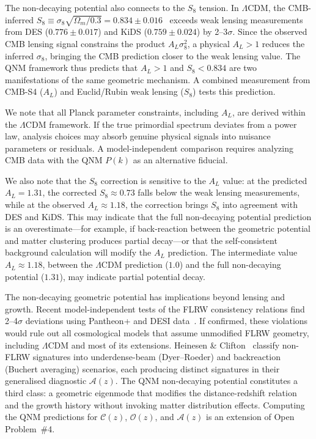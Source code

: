 \documentclass[aps,prd,twocolumn,superscriptaddress,showpacs,preprintnumbers,amsmath,amssymb,nofootinbib]{revtex4-2}
\newcommand{\lcdm}{$\Lambda$CDM}
\begin{document}
The non-decaying potential also connects to the $S_8$ tension. In \lcdm, the CMB-inferred $S_8 \equiv \sigma_8\sqrt{\Omega_m/0.3} = 0.834 \pm 0.016$~\cite{Planck2020} exceeds weak lensing measurements from DES ($0.776 \pm 0.017$) and KiDS ($0.759 \pm 0.024$) by 2--3$\sigma$. Since the observed CMB lensing signal constrains the product $A_L \sigma_8^2$, a physical $A_L > 1$ reduces the inferred $\sigma_8$, bringing the CMB prediction closer to the weak lensing value. The QNM framework thus predicts that $A_L > 1$ and $S_8 < 0.834$ are two manifestations of the same geometric mechanism. A combined measurement from CMB-S4 ($A_L$) and Euclid/Rubin weak lensing ($S_8$) tests this prediction.

We note that all Planck parameter constraints, including $A_L$, are derived within the \lcdm{} framework. If the true primordial spectrum deviates from a power law, analysis choices may absorb genuine physical signals into nuisance parameters or residuals. A model-independent comparison requires analyzing CMB data with the QNM $P(k)$ as an alternative fiducial.

We also note that the $S_8$ correction is sensitive to the $A_L$ value: at the predicted $A_L = 1.31$, the corrected $S_8 \approx 0.73$ falls below the weak lensing measurements, while at the observed $A_L \approx 1.18$, the correction brings $S_8$ into agreement with DES and KiDS. This may indicate that the full non-decaying potential prediction is an overestimate---for example, if back-reaction between the geometric potential and matter clustering produces partial decay---or that the self-consistent background calculation will modify the $A_L$ prediction. The intermediate value $A_L \approx 1.18$, between the \lcdm{} prediction ($1.0$) and the full non-decaying potential ($1.31$), may indicate partial potential decay.

The non-decaying geometric potential has implications beyond lensing and growth. Recent model-independent tests of the FLRW consistency relations find 2--4$\sigma$ deviations using Pantheon+ and DESI data~\cite{KoksbangHeinesen2026a,KoksbangHeinesen2026b}. If confirmed, these violations would rule out all cosmological models that assume unmodified FLRW geometry, including \lcdm{} and most of its extensions. Heinesen \& Clifton~\cite{HeinesenClifton2026} classify non-FLRW signatures into underdense-beam (Dyer--Roeder) and backreaction (Buchert averaging) scenarios, each producing distinct signatures in their generalised diagnostic $\mathcal{A}(z)$. The QNM non-decaying potential constitutes a third class: a geometric eigenmode that modifies the distance-redshift relation and the growth history without invoking matter distribution effects. Computing the QNM predictions for $\mathcal{C}(z)$, $\mathcal{O}(z)$, and $\mathcal{A}(z)$ is an extension of Open Problem~\#4.
\end{document}
